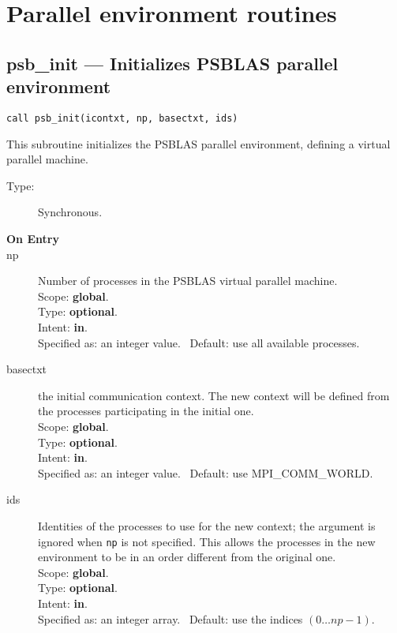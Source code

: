 
\section{Parallel environment routines}
\label{sec:parenv}

\clearpage\subsection*{psb\_init --- Initializes PSBLAS parallel
  environment}

\begin{verbatim}
call psb_init(icontxt, np, basectxt, ids)
\end{verbatim}

This subroutine initializes the PSBLAS parallel environment, defining
a virtual parallel machine.
\begin{description}
\item[Type:] Synchronous.
\item[\bf  On Entry ]
\item[np] Number of processes in the PSBLAS virtual parallel machine.\\
Scope: {\bf global}.\\
Type: {\bf optional}.\\
Intent: {\bf in}.\\
Specified as: an integer value. \
Default: use all available processes.
\item[basectxt] the initial communication context. The new context
  will be defined from the processes participating in the initial one.\\
  Scope: {\bf global}.\\
Type: {\bf optional}.\\
Intent: {\bf in}.\\
Specified as: an integer value. \
Default: use MPI\_COMM\_WORLD.
\item[ids] Identities of the processes to use for the new context; the
  argument is ignored when \verb|np| is not specified. This allows the
  processes in the new environment to be in an order different from the
  original one.\\
  Scope: {\bf global}.\\
Type: {\bf optional}.\\
Intent: {\bf in}.\\
Specified as: an integer array. \
Default: use the indices $(0\dots np-1)$.  
\end{description}

